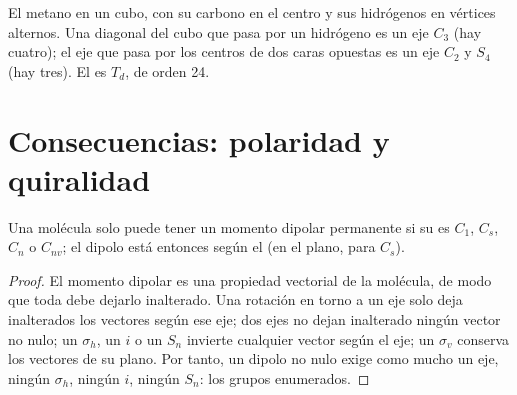 \begin{omfigure}

{\small El metano en un cubo, con su carbono en el centro y sus hidrógenos en
vértices alternos. Una diagonal del cubo que pasa por un hidrógeno es un eje $C_3$
(hay cuatro); el eje que pasa por los centros de dos caras opuestas es un eje $C_2$ y
$S_4$ (hay tres). El  es $T_d$, de orden 24.}
\end{omfigure}

\section{Consecuencias: polaridad y quiralidad}

\begin{theorem}\label{thm:b3:point-groups:polar}
Una molécula solo puede tener un momento dipolar permanente si su  es
$C_1$, $C_s$, $C_n$ o $C_{nv}$; el dipolo está entonces según el 
(en el plano, para $C_s$).
\end{theorem}

\begin{proof}
El momento dipolar es una propiedad vectorial de la molécula, de modo que toda  debe dejarlo inalterado. Una rotación en torno a un eje solo deja inalterados
los vectores según ese eje; dos ejes no dejan inalterado ningún vector no nulo; un
$\sigma_h$, un $i$ o un $S_n$ invierte cualquier vector según el eje; un $\sigma_v$
conserva los vectores de su plano. Por tanto, un dipolo no nulo exige como mucho un
eje, ningún $\sigma_h$, ningún $i$, ningún $S_n$: los grupos enumerados.
\end{proof}

